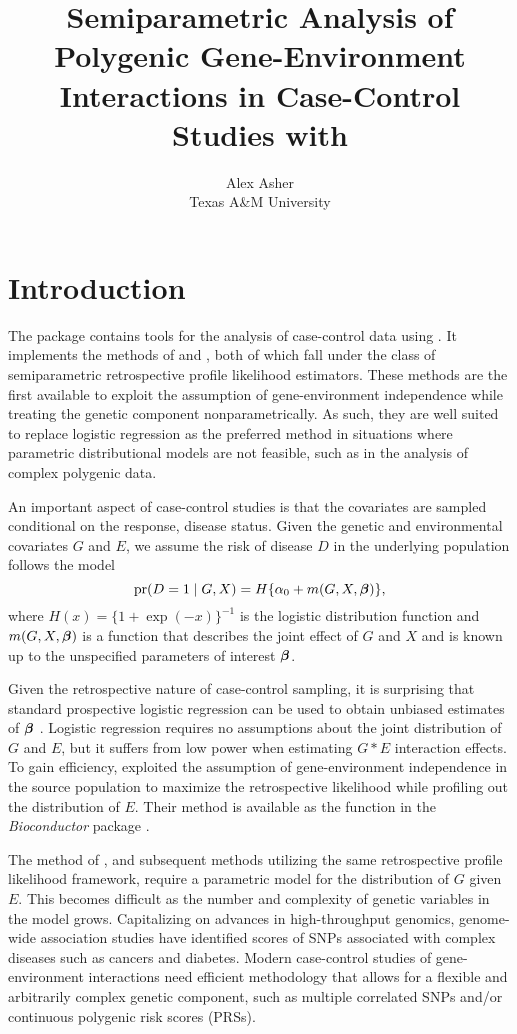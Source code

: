 \documentclass[nojss]{jss}
\author{
Alex Asher\\Texas A\&M University
}
\title{Semiparametric Analysis of Polygenic Gene-Environment Interactions in
Case-Control Studies with \pkg{caseControlGE}}
\begin{document}
\begin{titlepage}
\end{titlepage}

\def\bbeta{\mbox{\boldmath $\beta$}} \def\pr{\hbox{pr}}

\section{Introduction}

The  package \citep{Asher2018R} contains tools for
the analysis of case-control data using  \citep{R2018}. It
implements the methods of \citet{Stalder2017} and
\citet{Wang2018unpublished}, both of which fall under the class of
semiparametric retrospective profile likelihood estimators. These
methods are the first available to exploit the assumption of
gene-environment independence while treating the genetic component
nonparametrically. As such, they are well suited to replace logistic
regression as the preferred method in situations where parametric
distributional models are not feasible, such as in the analysis of
complex polygenic data.

An important aspect of case-control studies is that the covariates are
sampled conditional on the response, disease status. Given the genetic
and environmental covariates \(G\) and \(E\), we assume the risk of
disease \(D\) in the underlying population follows the model
\[ \pr(D=1 \mid G,X) = H\{\alpha_0 + m(G,X,\bbeta)\}, \] where
\(H(x)=\{ 1 + \exp(-x)\}^{-1}\) is the logistic distribution function
and \(m(G,X,\bbeta)\) is a function that describes the joint effect of
\(G\) and \(X\) and is known up to the unspecified parameters of
interest \(\bbeta\).

Given the retrospective nature of case-control sampling, it is
surprising that standard prospective logistic regression can be used to
obtain unbiased estimates of \(\bbeta\) \citep{PrenticePyke1979}.
Logistic regression requires no assumptions about the joint distribution
of \(G\) and \(E\), but it suffers from low power when estimating
\(G * E\) interaction effects. To gain efficiency,
\citet{ChatterjeeCarroll2005} exploited the assumption of
gene-environment independence in the source population to maximize the
retrospective likelihood while profiling out the distribution of \(E\).
Their method is available as the function  in the
\emph{Bioconductor} package  \citep{CGEN2012}.

The method of \citeauthor{ChatterjeeCarroll2005}, and subsequent methods
utilizing the same retrospective profile likelihood framework, require a
parametric model for the distribution of \(G\) given \(E\). This becomes
difficult as the number and complexity of genetic variables in the model
grows. Capitalizing on advances in high-throughput genomics, genome-wide
association studies have identified scores of SNPs associated with
complex diseases such as cancers and diabetes. Modern case-control
studies of gene-environment interactions need efficient methodology that
allows for a flexible and arbitrarily complex genetic component, such as
multiple correlated SNPs and/or continuous polygenic risk scores (PRSs).
\end{document}

